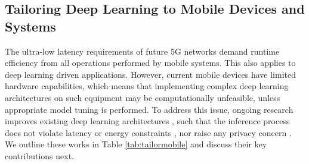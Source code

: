 \documentclass[journal,comsoc,letter]{IEEEtran}
\begin{document}
\subsection{Tailoring Deep Learning to Mobile Devices and Systems}
The ultra-low latency requirements of future 5G networks demand runtime efficiency from all operations performed by mobile systems. This also applies to deep learning driven applications. However, current mobile devices have limited hardware capabilities, which means that implementing complex deep learning architectures on such equipment may be computationally unfeasible, unless appropriate model tuning is performed. To address this issue, ongoing research improves existing deep learning architectures \cite{cheng2017survey}, such that the inference process does not violate latency or energy constraints \cite{lane2017squeezing, tang2017enabling}, nor raise any privacy concern \cite{wang2018deep}. We outline these works in Table \ref{tab:tailormobile} and discuss their key contributions next.
\end{document}
